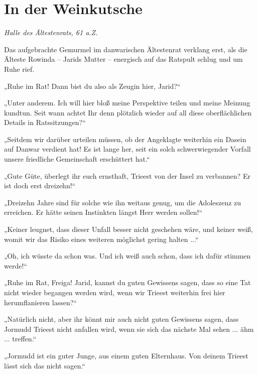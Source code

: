 \newpage
\section{In der Weinkutsche}










\textit{Halle des Ältestenrats, 61 a.Z.}\bigskip



Das aufgebrachte Gemurmel im danwarischen Ältestenrat verklang erst, als die Älteste Rowinda – Jarids Mutter – energisch auf das Ratspult schlug und um Ruhe rief.

„Ruhe im Rat! Dann bist du also als Zeugin hier, Jarid?“

„Unter anderem. Ich will hier bloß meine Perspektive teilen und meine Meinung kundtun. Seit wann achtet Ihr denn plötzlich wieder auf all diese oberflächlichen Details in Ratssitzungen?“

„Seitdem wir darüber urteilen müssen, ob der Angeklagte weiterhin ein Dasein auf Danwar verdient hat! Es ist lange her, seit ein solch schwerwiegender Vorfall unsere friedliche Gemeinschaft erschüttert hat.“

„Gute Güte, überlegt ihr euch ernsthaft, Trieest von der Insel zu verbannen? Er ist doch erst dreizehn!“

„Dreizehn Jahre sind für solche wie ihn weitaus genug, um die Adoleszenz zu erreichen. Er hätte seinen Instinkten längst Herr werden sollen!“

„Keiner leugnet, dass dieser Unfall besser nicht geschehen wäre, und keiner weiß, womit wir das Risiko eines weiteren möglichst gering halten ...“

„Oh, ich wüsste da schon was. Und ich weiß auch schon, dass ich dafür stimmen werde!“

„Ruhe im Rat, Freiga! Jarid, kannst du guten Gewissens sagen, dass so eine Tat nicht wieder begangen werden wird, wenn wir Trieest weiterhin frei hier herumflanieren lassen?“

„Natürlich nicht, aber ihr könnt mir auch nicht guten Gewissens sagen, dass Jormudd Trieest nicht anfallen wird, wenn sie sich das nächste Mal sehen ... ähm ... treffen.“

„Jormudd ist ein guter Junge, aus einem guten Elternhaus. Von deinem Trieest lässt sich das nicht sagen.“








